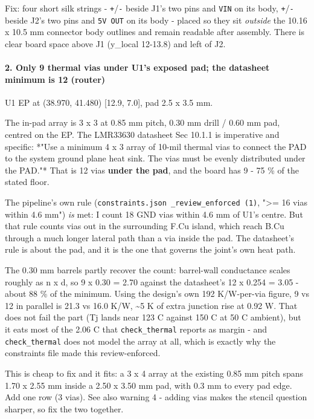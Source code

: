 \documentclass[11pt,a4paper]{article}
\begin{document}
Fix: four short silk strings - \texttt{+}/\texttt{-} beside J1's two pins and \texttt{VIN} on its body, \texttt{+}/\texttt{-} beside J2's two pins and \texttt{5V OUT} on its body - placed so they sit \emph{outside} the 10.16 x 10.5 mm connector body outlines and remain readable after assembly. There is clear board space above J1 (y\_local 12-13.8) and left of J2.

\paragraph*{2. Only 9 thermal vias under U1's exposed pad; the datasheet minimum is 12 (router)}
U1 EP at (38.970, 41.480) {[}12.9, 7.0{]}, pad 2.5 x 3.5 mm.

The in-pad array is 3 x 3 at 0.85 mm pitch, 0.30 mm drill / 0.60 mm pad, centred on the EP. The LMR33630 datasheet Sec 10.1.1 is imperative and specific: {*}"Use a minimum 4 x 3 array of 10-mil thermal vias to connect the PAD to the system ground plane heat sink. The vias must be evenly distributed under the PAD."{*} That is 12 vias \textbf{under the pad}, and the board has 9 - 75 \% of the stated floor.

The pipeline's own rule (\texttt{constraints.json \_review\_enforced (1)}, "\textgreater{}= 16 vias within 4.6 mm") \emph{is} met: I count 18 GND vias within 4.6 mm of U1's centre. But that rule counts vias out in the surrounding F.Cu island, which reach B.Cu through a much longer lateral path than a via inside the pad. The datasheet's rule is about the pad, and it is the one that governs the joint's own heat path.

The 0.30 mm barrels partly recover the count: barrel-wall conductance scales roughly as n x d, so 9 x 0.30 = 2.70 against the datasheet's 12 x 0.254 = 3.05 - about 88 \% of the minimum. Using the design's own 192 K/W-per-via figure, 9 vs 12 in parallel is 21.3 vs 16.0 K/W, \textasciitilde{}5 K of extra junction rise at 0.92 W. That does not fail the part (Tj lands near 123 C against 150 C at 50 C ambient), but it eats most of the 2.06 C that \texttt{check\_thermal} reports as margin - and \texttt{check\_thermal} does not model the array at all, which is exactly why the constraints file made this review-enforced.

This is cheap to fix and it fits: a 3 x 4 array at the existing 0.85 mm pitch spans 1.70 x 2.55 mm inside a 2.50 x 3.50 mm pad, with 0.3 mm to every pad edge. Add one row (3 vias). See also warning 4 - adding vias makes the stencil question sharper, so fix the two together.
\end{document}
